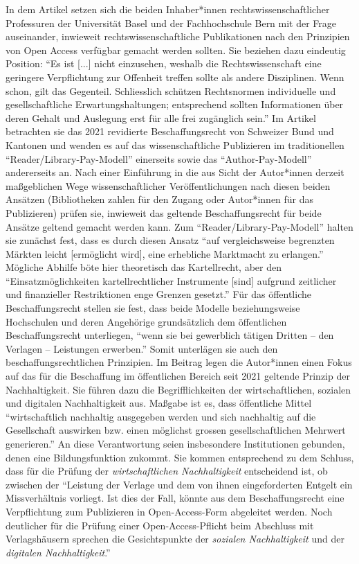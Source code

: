 \documentclass[a4paper,
fontsize=11pt,
oneside,
numbers=noperiodatend,
parskip=half-,
bibliography=totoc,
final
]{scrartcl}
\begin{document}
In dem Artikel setzen sich die beiden Inhaber*innen
rechtswissenschaftlicher Professuren der Universität Basel und der
Fachhochschule Bern mit der Frage auseinander, inwieweit
rechtswissenschaftliche Publikationen nach den Prinzipien von Open
Access verfügbar gemacht werden sollten. Sie beziehen dazu eindeutig
Position: \enquote{Es ist {[}...{]} nicht einzusehen, weshalb die
Rechtswissenschaft eine geringere Verpflichtung zur Offenheit treffen
sollte als andere Disziplinen. Wenn schon, gilt das Gegenteil.
Schliesslich schützen Rechtsnormen individuelle und gesellschaftliche
Erwartungshaltungen; entsprechend sollten Informationen über deren
Gehalt und Auslegung erst für alle frei zugänglich sein.} Im Artikel
betrachten sie das 2021 revidierte Beschaffungsrecht von Schweizer Bund
und Kantonen und wenden es auf das wissenschaftliche Publizieren im
traditionellen \enquote{Reader/Library-Pay-Modell} einerseits sowie das
\enquote{Author-Pay-Modell} andererseits an. Nach einer Einführung in
die aus Sicht der Autor*innen derzeit maßgeblichen Wege
wissenschaftlicher Veröffentlichungen nach diesen beiden Ansätzen
(Bibliotheken zahlen für den Zugang oder Autor*innen für das
Publizieren) prüfen sie, inwieweit das geltende Beschaffungsrecht für
beide Ansätze geltend gemacht werden kann. Zum
\enquote{Reader/Library-Pay-Modell} halten sie zunächst fest, dass es
durch diesen Ansatz \enquote{auf vergleichsweise begrenzten Märkten
leicht {[}ermöglicht wird{]}, eine erhebliche Marktmacht zu erlangen.}
Mögliche Abhilfe böte hier theoretisch das Kartellrecht, aber den
\enquote{Einsatzmöglichkeiten kartellrechtlicher Instrumente {[}sind{]}
aufgrund zeitlicher und finanzieller Restriktionen enge Grenzen
gesetzt.} Für das öffentliche Beschaffungsrecht stellen sie fest, dass
beide Modelle beziehungsweise Hochschulen und deren Angehörige
grundsätzlich dem öffentlichen Beschaffungsrecht unterliegen,
\enquote{wenn sie bei gewerblich tätigen Dritten – den Verlagen – Leistungen erwerben.} Somit unterlägen sie auch den
beschaffungsrechtlichen Prinzipien. Im Beitrag legen die Autor*innen
einen Fokus auf das für die Beschaffung im öffentlichen Bereich seit
2021 geltende Prinzip der Nachhaltigkeit. Sie führen dazu die
Begrifflichkeiten der wirtschaftlichen, sozialen und digitalen
Nachhaltigkeit aus. Maßgabe ist es, dass öffentliche Mittel
\enquote{wirtschaftlich nachhaltig ausgegeben werden und sich nachhaltig
auf die Gesellschaft auswirken bzw. einen möglichst grossen
gesellschaftlichen Mehrwert generieren.} An diese Verantwortung seien
insbesondere Institutionen gebunden, denen eine Bildungsfunktion
zukommt. Sie kommen entsprechend zu dem Schluss, dass für die Prüfung
der \emph{wirtschaftlichen Nachhaltigkeit} entscheidend ist, ob zwischen
der \enquote{Leistung der Verlage und dem von ihnen eingeforderten
Entgelt ein Missverhältnis vorliegt. Ist dies der Fall, könnte aus dem
Beschaffungsrecht eine Verpflichtung zum Publizieren in Open-Access-Form
abgeleitet werden. Noch deutlicher für die Prüfung einer
Open-Access-Pflicht beim Abschluss mit Verlagshäusern sprechen die
Gesichtspunkte der \emph{sozialen Nachhaltigkeit} und der
\emph{digitalen Nachhaltigkeit}.}
\end{document}
